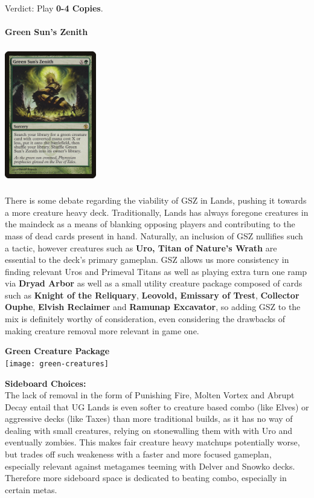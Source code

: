 \documentclass{report}
\begin{document}
Verdict: Play \textbf{0-4 Copies}.\\\\
\newpage
\textbf{Green Sun's Zenith}
\begin{center}
\includegraphics [width = 4cm, height = 6cm] {gsz}
\end{center}
There is some debate regarding the viability of GSZ in Lands, pushing it towards a more creature heavy deck. Traditionally, Lands has always foregone creatures in the maindeck as a means of blanking opposing players and contributing to the mass of dead cards present in hand. Naturally, an inclusion of GSZ nullifies such a tactic, however creatures such as \textbf{Uro, Titan of Nature's Wrath} are essential to the deck's primary gameplan. GSZ allows us more consistency in finding relevant Uros and Primeval Titans as well as playing extra turn one ramp via \textbf{Dryad Arbor} as well as a small utility creature package composed of cards such as \textbf{Knight of the Reliquary}, \textbf{Leovold, Emissary of Trest}, \textbf{Collector Ouphe}, \textbf{Elvish Reclaimer} and \textbf{Ramunap Excavator}, so adding GSZ to the mix is definitely worthy of consideration, even considering the drawbacks of making creature removal more relevant in game one.\\
\begin{center}
\textbf{Green Creature Package}\\
\texttt{[image: green-creatures]}
\end{center}
\newpage
\textbf{Sideboard Choices:}\\
The lack of removal in the form of Punishing Fire, Molten Vortex and Abrupt Decay entail that UG Lands is even softer to creature based combo (like Elves) or aggressive decks (like Taxes) than more traditional builds, as it has no way of dealing with small creatures, relying on stonewalling them with with Uro and eventually zombies. This makes fair creature heavy matchups potentially worse, but trades off such weakeness with a faster and more focused gameplan, especially relevant against metagames teeming with Delver and Snowko decks. Therefore more sideboard space is dedicated to beating combo, especially in certain metas.\\\\
\end{document}
